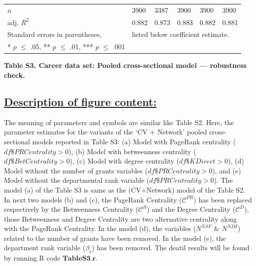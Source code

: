 \documentclass{article}\usepackage[]{graphicx}\usepackage[]{color}
\begin{document}
\begin{table}[h!]
\begin{center}
{\begin{tabular}{l l l l l l}
    \hline
    
    \rowcolor{gray!33} 
    $\textit{n}$
    & 3900 & 3387 & 3900 & 3900 & 3900 \\
    
    \rowcolor{gray!33} 
    adj. ${R^2}$ 
    & 0.882 & 0.873 & 0.883 & 0.882 & 0.881 \\
    
    \hline
    \hline
    
    Standard errors in parentheses, & \multicolumn{5}{l}{listed below coefficient estimate.} \\
    {* $\textit{p}$ $\leq$ .05, ** $\textit{p}$ $\leq$ .01, *** $\textit{p}$ $\leq$ .001}
    
  \end{tabular}%
  }
  \end{center}
\end{table}
\begin{center}
\par{\textbf{Table S3. Career data set: Pooled cross-sectional model --- robustness check.}}
\end{center}
\newpage
\subsection*{\underline{Description of figure content:}}
\par{
The meaning of parameters and symbols are similar like Table S2. Here, the parameter estimates for the variants of the ‘CV + Network’ pooled cross-sectional models reported in Table S3: (a) Model with PageRank centrality ($df\$PRCentrality > 0$), (b) Model with betweenness centrality ($df\$BetCentrality > 0$), (c) Model with degree centrality ($df\$KDirect > 0$), (d) Model without the number of grants variables ($df\$PRCentrality > 0$), and (e) Model without the departmental rank variable ($df\$PRCentrality > 0$). The model (a) of the Table S3 is same as the (CV+Network) model of the Table S2. In next two models (b) and (c), the PageRank Centrality ($\mathscr{C}^{PR}$) has been replaced respectively by the Betweenness Centrality ($\mathscr{C}^{B}$) and the Degree Centrality ($\mathscr{C}^{D}$), those Betweenness and Degree Centrality are two alternative centrality along with the PageRank Centrality. In the model (d), the variables (${N^{NSF}}$ \& ${N^{NIH}}$) related to the number of grants have been removed. In the model (e), the department rank variable ($\beta_{r}$) has been removed. The deatil results will be found by running R code $\textbf{TableS3.r}$.
}
\end{document}
